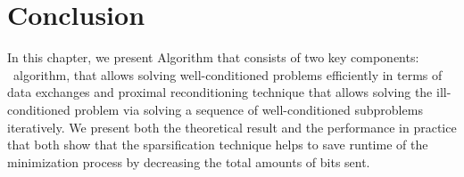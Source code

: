 \section{Conclusion}
In this chapter, we present \recoalgo Algorithm that consists of two key components: \spyI~algorithm, that allows solving well-conditioned problems efficiently in terms of data exchanges and proximal reconditioning technique that allows solving the ill-conditioned problem via solving a sequence of well-conditioned subproblems iteratively. We present both the theoretical result and the performance in practice that both show that the sparsification technique helps to save runtime of the minimization process by decreasing the total amounts of bits sent.